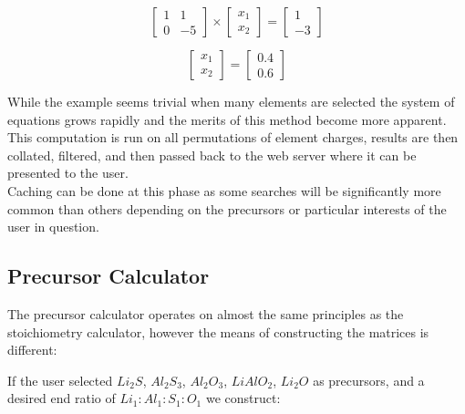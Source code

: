 \begin{minipage}{0.4\textwidth}
	\begin{equation*}
	\begin{bmatrix}
	1 & 1 \\
	0 & -5
	\end{bmatrix}
	\times
	\begin{bmatrix}
	x_1 \\
	x_2
	\end{bmatrix}
	=
	\begin{bmatrix}
	1 \\
	-3
	\end{bmatrix}
	\end{equation*}
	
	\begin{equation*}
	\begin{bmatrix}
	x_1 \\
	x_2
	\end{bmatrix}
	=
	\begin{bmatrix}
	0.4 \\
	0.6
	\end{bmatrix}
	\end{equation*}
\end{minipage}
\hfill
\begin{minipage}{0.6\textwidth}
	While the example seems trivial when many elements are selected the system of equations grows rapidly and the merits of this method become more apparent. \\
	
	This computation is run on all permutations of element charges, results are then collated, filtered, and then passed back to the web server where it can be presented to the user. \\
	
	Caching can be done at this phase as some searches will be significantly more common than others depending on the precursors or particular interests of the user in question. 
\end{minipage}

\subsection{Precursor Calculator}
The precursor calculator operates on almost the same principles as the stoichiometry calculator, however the means of constructing the matrices is different:

\begin{center}
	If the user selected $Li_2S$, $Al_2S_3$, $Al_2O_3$, $LiAlO_2$, $Li_2O$ as precursors, and a desired end ratio of $Li_1 : Al_1 : S_1 : O_1$ we construct:
\end{center}

